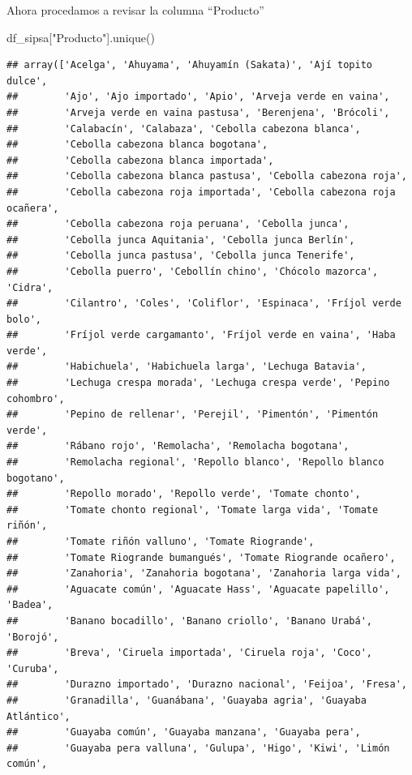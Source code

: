 \documentclass[
]{book}
\newenvironment{Shaded}{\begin{snugshade}}{\end{snugshade}}
\newcommand{\NormalTok}[1]{#1}
\newcommand{\StringTok}[1]{\textcolor[rgb]{0.31,0.60,0.02}{#1}}
\begin{document}
Ahora procedamos a revisar la columna ``Producto''

\begin{Shaded}
\begin{Highlighting}[]

\NormalTok{df\_sipsa[}\StringTok{"Producto"}\NormalTok{].unique()}
\end{Highlighting}
\end{Shaded}

\begin{verbatim}
## array(['Acelga', 'Ahuyama', 'Ahuyamín (Sakata)', 'Ají topito dulce',
##        'Ajo', 'Ajo importado', 'Apio', 'Arveja verde en vaina',
##        'Arveja verde en vaina pastusa', 'Berenjena', 'Brócoli',
##        'Calabacín', 'Calabaza', 'Cebolla cabezona blanca',
##        'Cebolla cabezona blanca bogotana',
##        'Cebolla cabezona blanca importada',
##        'Cebolla cabezona blanca pastusa', 'Cebolla cabezona roja',
##        'Cebolla cabezona roja importada', 'Cebolla cabezona roja ocañera',
##        'Cebolla cabezona roja peruana', 'Cebolla junca',
##        'Cebolla junca Aquitania', 'Cebolla junca Berlín',
##        'Cebolla junca pastusa', 'Cebolla junca Tenerife',
##        'Cebolla puerro', 'Cebollín chino', 'Chócolo mazorca', 'Cidra',
##        'Cilantro', 'Coles', 'Coliflor', 'Espinaca', 'Fríjol verde bolo',
##        'Fríjol verde cargamanto', 'Fríjol verde en vaina', 'Haba verde',
##        'Habichuela', 'Habichuela larga', 'Lechuga Batavia',
##        'Lechuga crespa morada', 'Lechuga crespa verde', 'Pepino cohombro',
##        'Pepino de rellenar', 'Perejil', 'Pimentón', 'Pimentón verde',
##        'Rábano rojo', 'Remolacha', 'Remolacha bogotana',
##        'Remolacha regional', 'Repollo blanco', 'Repollo blanco bogotano',
##        'Repollo morado', 'Repollo verde', 'Tomate chonto',
##        'Tomate chonto regional', 'Tomate larga vida', 'Tomate riñón',
##        'Tomate riñón valluno', 'Tomate Riogrande',
##        'Tomate Riogrande bumangués', 'Tomate Riogrande ocañero',
##        'Zanahoria', 'Zanahoria bogotana', 'Zanahoria larga vida',
##        'Aguacate común', 'Aguacate Hass', 'Aguacate papelillo', 'Badea',
##        'Banano bocadillo', 'Banano criollo', 'Banano Urabá', 'Borojó',
##        'Breva', 'Ciruela importada', 'Ciruela roja', 'Coco', 'Curuba',
##        'Durazno importado', 'Durazno nacional', 'Feijoa', 'Fresa',
##        'Granadilla', 'Guanábana', 'Guayaba agria', 'Guayaba Atlántico',
##        'Guayaba común', 'Guayaba manzana', 'Guayaba pera',
##        'Guayaba pera valluna', 'Gulupa', 'Higo', 'Kiwi', 'Limón común',

\end{verbatim}
\end{document}

